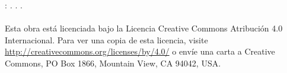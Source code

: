 \thispagestyle{empty}

\hfill

\vfill

\noindent\myName: \textit{\myTitleOneLine.} \mySubtitle. \myTime.\\
\\
Esta obra está licenciada bajo la Licencia Creative Commons Atribución 4.0 Internacional.
Para ver una copia de esta licencia, visite \\
\url{http://creativecommons.org/licenses/by/4.0/}
o envíe una carta a Creative Commons, PO Box 1866, Mountain View, CA 94042, USA.
%
%
%
%
%
